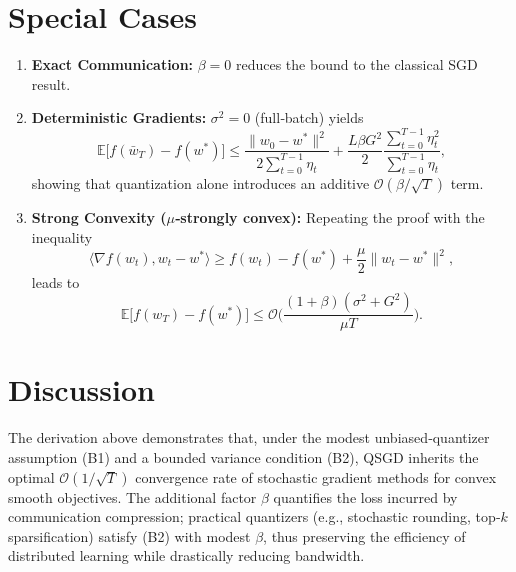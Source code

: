 \documentclass{article}
\newcommand{\EE}{\mathbb{E}}
\begin{document}
\section*{Special Cases}
\begin{enumerate}[label=\arabic*., leftmargin=*, itemsep=0pt]
\item \textbf{Exact Communication:} $\beta=0$ reduces the bound to the classical SGD result.
\item \textbf{Deterministic Gradients:} $\sigma^{2}=0$ (full‑batch) yields
\[
\EE\big[f(\bar w_T)-f(w^*)\big]\le
\frac{\|w_0-w^*\|^{2}}{2\sum_{t=0}^{T-1}\eta_t}
+\frac{L\beta G^{2}}{2}\frac{\sum_{t=0}^{T-1}\eta_t^{2}}{\sum_{t=0}^{T-1}\eta_t},
\]
showing that quantization alone introduces an additive $\mathcal{O}(\beta/\sqrt{T})$ term.
\item \textbf{Strong Convexity ($\mu$‑strongly convex):} Repeating the proof with the inequality
\[
\langle\nabla f(w_t),w_t-w^*\rangle\ge f(w_t)-f(w^*)+\frac{\mu}{2}\|w_t-w^*\|^{2},
\]
leads to
\[
\EE\big[f(w_T)-f(w^*)\big]\le
\mathcal{O}\!\Big(\frac{(1+\beta)(\sigma^{2}+G^{2})}{\mu T}\Big).
\]
\end{enumerate}

\section*{Discussion}
The derivation above demonstrates that, under the modest unbiased‑quantizer assumption (B1) and a bounded variance condition (B2), QSGD inherits the optimal $\mathcal{O}(1/\sqrt{T})$ convergence rate of stochastic gradient methods for convex smooth objectives. The additional factor $\beta$ quantifies the loss incurred by communication compression; practical quantizers (e.g., stochastic rounding, top‑$k$ sparsification) satisfy (B2) with modest $\beta$, thus preserving the efficiency of distributed learning while drastically reducing bandwidth.
\end{document}
